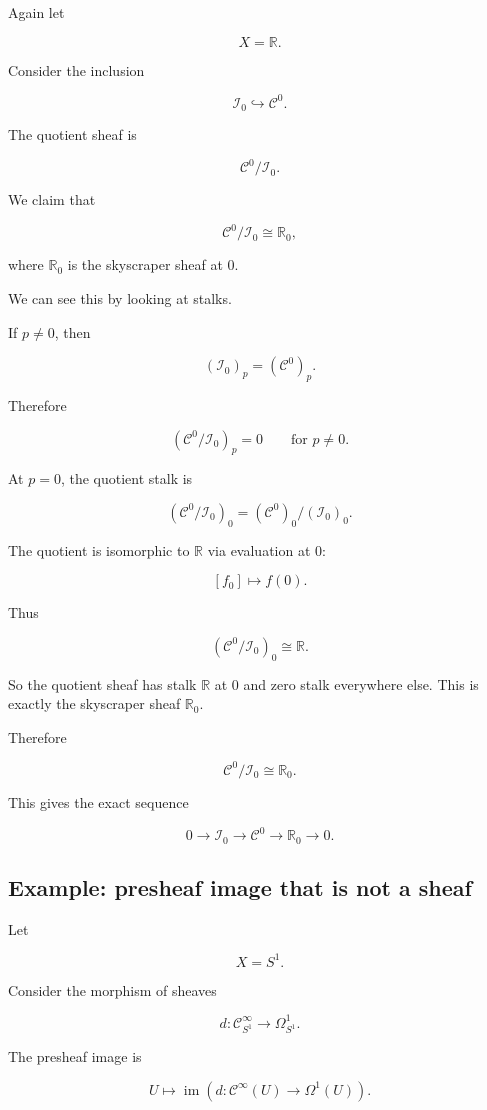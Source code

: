 \documentclass[12pt,a4paper]{article}
\DeclareMathOperator{\im}{im}
\theoremstyle{notespace}
\newcommand{\C}{\mathcal C}
\newcommand{\I}{\mathcal I}
\begin{document}
	Again let
	
	\[
	X=\mathbb R.
	\]
	
	Consider the inclusion
	
	\[
	\I_0\hookrightarrow \C^0.
	\]
	
	The quotient sheaf is
	
	\[
	\C^0/\I_0.
	\]
	
	We claim that
	
	\[
	\C^0/\I_0\cong \mathbb R_0,
	\]
	
	where $\mathbb R_0$ is the skyscraper sheaf at $0$.
	
	We can see this by looking at stalks.
	
	If $p\neq 0$, then
	
	\[
	(\I_0)_p=(\C^0)_p.
	\]
	
	Therefore
	
	\[
	(\C^0/\I_0)_p=0
	\qquad
	\text{for } p\neq 0.
	\]
	
	At $p=0$, the quotient stalk is
	
	\[
	(\C^0/\I_0)_0
	=
	(\C^0)_0/(\I_0)_0.
	\]
	
	The quotient is isomorphic to $\mathbb R$ via evaluation at $0$:
	
	\[
	[f_0]\longmapsto f(0).
	\]
	
	Thus
	
	\[
	(\C^0/\I_0)_0\cong \mathbb R.
	\]
	
	So the quotient sheaf has stalk $\mathbb R$ at $0$ and zero stalk everywhere
	else. This is exactly the skyscraper sheaf $\mathbb R_0$.
	
	Therefore
	
	\[
	\boxed{
		\C^0/\I_0\cong \mathbb R_0.
	}
	\]
	
	This gives the exact sequence
	
	\[
	0
	\longrightarrow
	\I_0
	\longrightarrow
	\C^0
	\longrightarrow
	\mathbb R_0
	\longrightarrow
	0.
	\]
	
	\subsection{Example: presheaf image that is not a sheaf}
	
	Let
	
	\[
	X=S^1.
	\]
	
	Consider the morphism of sheaves
	
	\[
	d:\C^\infty_{S^1}\to \Omega^1_{S^1}.
	\]
	
	The presheaf image is
	
	\[
	U
	\longmapsto
	\im
	\left(
	d:\C^\infty(U)\to \Omega^1(U)
	\right).
	\]
	
\end{document}
